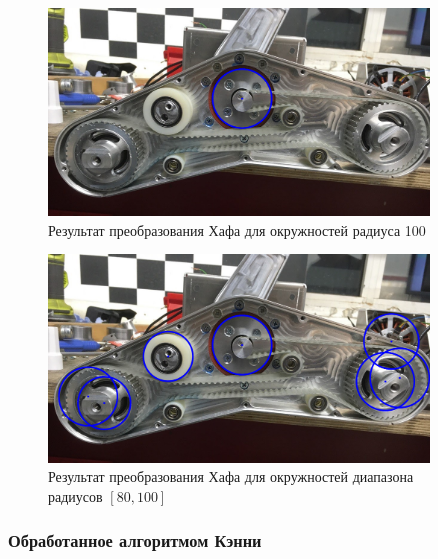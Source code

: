 
\begin{figure}[H]
    \centering
    \includegraphics[width=0.9\textwidth]{../outputs/image8_ordinary_r100.png}
    \caption{Результат преобразования Хафа для окружностей радиуса 100}
\end{figure}


\begin{figure}[H]
    \centering
    \includegraphics[width=0.9\textwidth]{../outputs/image8_ordinary_r80100.png}
    \caption{Результат преобразования Хафа для окружностей диапазона радиусов $[80, 100]$}
\end{figure}

\subsubsection{Обработанное алгоритмом Кэнни}

